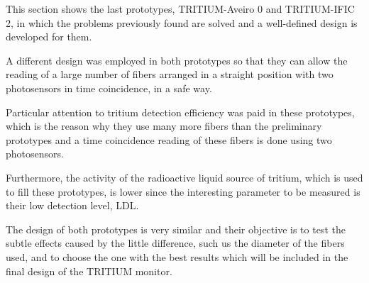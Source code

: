 This section shows the last prototypes, TRITIUM-Aveiro 0 and TRITIUM-IFIC 2, in which the problems previously found are solved and a well-defined design is developed for them.

A different design was employed in both prototypes so that they can allow the reading of a large number of fibers arranged in a straight position with two photosensors in time coincidence, in a safe way.

Particular attention to tritium detection efficiency was paid in these prototypes, which is the reason why they use many more fibers than the preliminary prototypes and a time coincidence reading of these fibers is done using two photosensors.

Furthermore, the activity of the radioactive liquid source of tritium, which is used to fill these prototypes, is lower since the interesting parameter to be measured is their low detection level, LDL.

The design of both prototypes is very similar and their objective is to test the subtle effects caused by the little difference, such us the diameter of the fibers used, and to choose the one with the best results which will be included in the final design of the TRITIUM monitor.